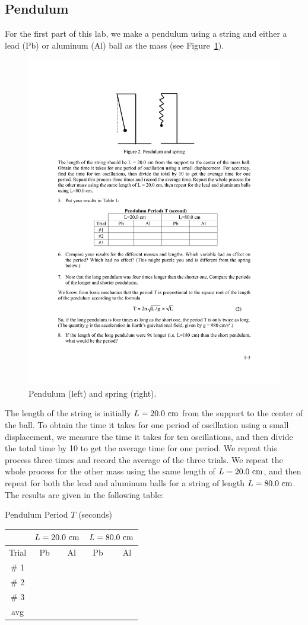 \documentclass[11pt]{NSF}
\begin{document}
\subsection{Pendulum}

For the first part of this lab, we make a pendulum using a 
string and either a lead (Pb) or aluminum (Al) ball as the
mass (see Figure~\ref{f:2}).
%
\begin{figure}[hbtp]
\begin{center}
\includegraphics[width=.5\textwidth]{fig1_2}
\caption{Pendulum (left) and spring (right).}
\label{f:2}
\end{center}
\end{figure}
%
The length of the string is initially $L = 20.0~{\rm cm}$ 
from the support to the center of the ball. 
To obtain the time it takes for one period of 
oscillation using a small displacement, we measure the 
time it takes for ten oscillations, and then divide 
the total time by 10 to get the average time for one period. 
We repeat this process three times and record the average 
of the three trials. 
We repeat the whole process for the other mass using 
the same length of $L = 20.0~{\rm cm}$, and 
then repeat for both the lead and aluminum balls for a
string of length $L=80.0~{\rm cm}$.
The results are given in the following table:
%
\begin{table}[hbtp]
\begin{center}
Pendulum Period $T$ (seconds)\\
\begin{tabular}{| c | c | c | c | c | }
\hline
&\multicolumn{2}{c}{$L=20.0~{\rm cm}$} \vrule
&\multicolumn{2}{c}{$L=80.0~{\rm cm}$} \vrule\\
\hline
Trial & \phantom{ }Pb\phantom{ } & Al & \phantom{ }Pb\phantom{ }\  & Al \\
\hline
\# 1 &  &  &  &  \\
\hline
\# 2  &  &  &  &  \\
\hline
\# 3  &  &  &  &  \\
\hline
avg   &  &  &  &  \\
\hline
\end{tabular}
\label{t:1}
\end{center}
\end{table}
\end{document}
